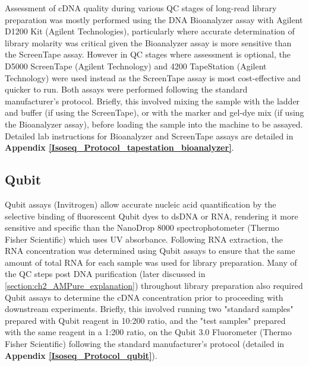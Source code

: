Assessment of cDNA quality during various QC stages of long-read library preparation was mostly performed using the DNA Bioanalyzer assay with Agilent D1200 Kit (Agilent Technologies), particularly where accurate determination of library molarity was critical given the Bioanalyzer assay is more sensitive than the ScreenTape assay. However in QC stages where assessment is optional, the D5000 ScreenTape (Agilent Technology) and 4200 TapeStation (Agilent Technology) were used instead as the ScreenTape assay is most cost-effective and quicker to run. Both assays were performed following the standard manufacturer's protocol. Briefly, this involved mixing the sample with the ladder and buffer (if using the ScreenTape), or with the marker and gel-dye mix (if using the Bioanalyzer assay), before loading the sample into the machine to be assayed. Detailed lab instructions for Bioanalyzer and ScreenTape assays are detailed in \textbf{Appendix \ref{Isoseq_Protocol_tapestation_bioanalyzer}}.

\subsection{Qubit}
\label{section:ch2_qubit}   
Qubit assays (Invitrogen) allow accurate nucleic acid quantification by the selective binding of fluorescent Qubit dyes to dsDNA or RNA, rendering it more sensitive and specific than the NanoDrop 8000 spectrophotometer (Thermo Fisher Scientific) which uses UV absorbance. Following RNA extraction, the RNA concentration was determined using Qubit assays to ensure that the same amount of total RNA for each sample was used for library preparation. Many of the QC steps post DNA purification (later discussed in \cref{section:ch2_AMPure_explanation}) throughout library preparation also required Qubit assays to determine the cDNA concentration prior to proceeding with downstream experiments. Briefly, this involved running two "standard samples" prepared with Qubit reagent in 10:200 ratio, and the "test samples" prepared with the same reagent in a 1:200 ratio, on the Qubit 3.0 Fluorometer (Thermo Fisher Scientific) following the standard manufacturer's protocol (detailed in \textbf{Appendix  \ref{Isoseq_Protocol_qubit}}).         

